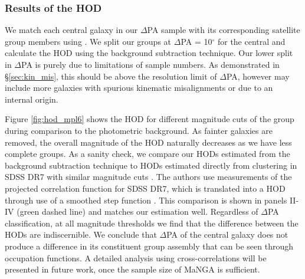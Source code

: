 \subsubsection{Results of the HOD}
We match each central galaxy in our $\Delta$PA sample with its corresponding satellite group members using \citet{yang2007}. We split our groups at $\Delta$PA = 10$^{\circ}$ for the central and calculate the HOD using the background subtraction technique. Our lower split in $\Delta$PA is purely due to limitations of sample numbers. As demonstrated in \S \ref{sec:kin_mis}, this should be above the resolution limit of $\Delta$PA, however may include more galaxies with spurious kinematic misalignments or due to an internal origin. 

Figure \ref{fig:hod_mpl6} shows the HOD for different magnitude cuts of the group during comparison to the photometric background. As fainter galaxies are removed, the overall magnitude of the HOD naturally decreases as we have less complete groups. As a sanity check, we compare our HODs estimated from the background subtraction technique to HODs estimated directly from clustering in SDSS DR7 with similar magnitude cuts \citep{zehavi2011}. The authors use measurements of the projected correlation function for SDSS DR7, which is translated into a HOD through use of a smoothed step function \citep[see equation 7;][]{zehavi2011}. This comparison is shown in panels II-IV (green dashed line) and matches our estimation well.
Regardless of $\Delta$PA classification, at all magnitude thresholds we find that the difference between the HODs are indiscernible. We conclude that $\Delta$PA of the central galaxy does not produce a difference in its constituent group assembly that can be seen through occupation functions. A detailed analysis using cross-correlations will be presented in future work, once the sample size of MaNGA is sufficient. 

